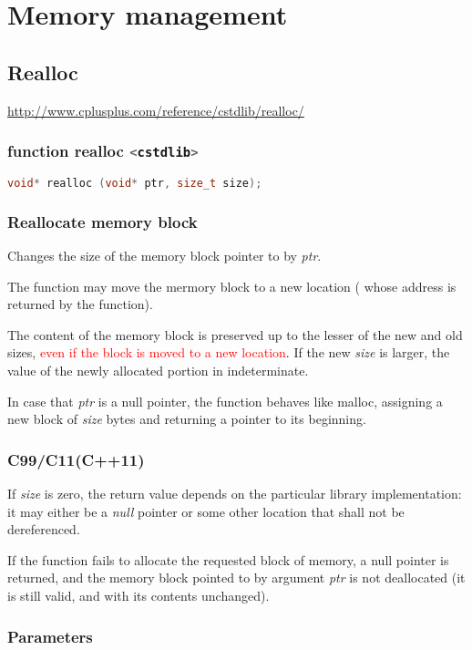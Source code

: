 
\chapter{Memory management}
\section{Realloc}
\url{http://www.cplusplus.com/reference/cstdlib/realloc/}
\subsection{function realloc \lstinline[language=c++]|<cstdlib>|}
\begin{lstlisting}[language=c++]
void* realloc (void* ptr, size_t size);
\end{lstlisting}

\subsection{Reallocate memory block}
Changes the size of the memory block pointer to by \textit{ptr}.

The function may move the mermory block to a new location ( whose address is returned by the function).

The content of the memory block is preserved up to the lesser of the new and old sizes, \textcolor{red}{even if the block is moved to a new location}. If the new \textit{size} is larger, the value of the newly allocated portion in indeterminate.

In case that \textit{ptr} is a null pointer, the function behaves like malloc, assigning a new block of \textit{size} bytes and returning a pointer to its beginning.

\subsection{C99/C11(C++11)}
If \textit{size} is zero, the return value depends on the particular library implementation: it may either be a \textit{null} pointer or some other location that shall not be dereferenced.

If the function fails to allocate the requested block of memory, a null pointer is returned, and the memory block pointed to by argument \textit{ptr} is not deallocated (it is still valid, and with its contents unchanged).

\subsection{Parameters}

